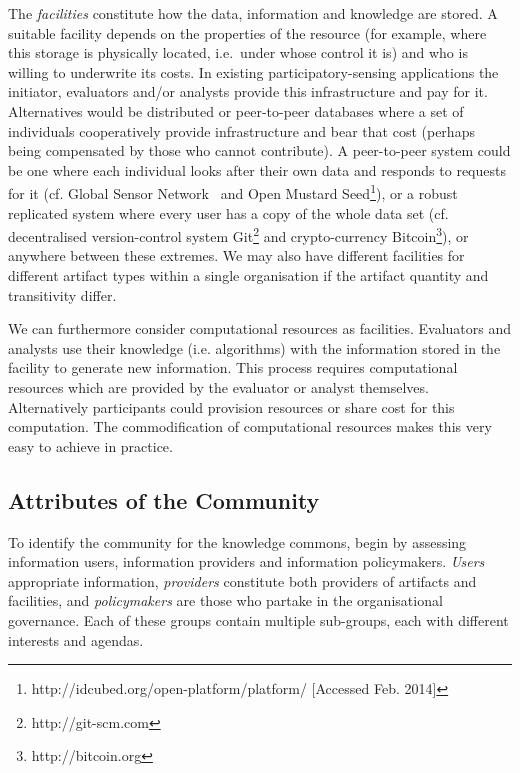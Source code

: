 The \emph{facilities} constitute how the data, information and knowledge are stored. A suitable facility depends on the properties of the resource (for example, where this storage is physically located, i.e.\ under whose control it is) and who is willing to underwrite its costs.  In existing participatory-sensing applications the initiator, evaluators and/or analysts provide this infrastructure and pay for it. Alternatives would be distributed or peer-to-peer databases where a set of individuals cooperatively provide infrastructure and bear that cost (perhaps being compensated by those who cannot contribute). 
A peer-to-peer system could be one where each individual looks after their own data and responds to requests for it (cf. Global Sensor Network~\citep{Aberer2006} and Open Mustard Seed\footnote{http://idcubed.org/open-platform/platform/ [Accessed Feb. 2014]}), or a robust replicated system where every user has a copy of the whole data set (cf. decentralised version-control system Git\footnote{http://git-scm.com} and crypto-currency Bitcoin\footnote{http://bitcoin.org}), or anywhere between these extremes. 
We may also have different facilities for different artifact types within a single organisation if the artifact quantity and transitivity differ.

We can furthermore consider computational resources as facilities.
Evaluators and analysts use their knowledge (i.e. algorithms) with the information stored in the facility to generate new information. This process requires computational resources which are provided by the evaluator or analyst themselves. Alternatively participants could provision resources or share cost for this computation. The commodification of computational resources makes this very easy to achieve in practice.

\subsection{Attributes of the Community}

To identify the community for the knowledge commons,  begin by assessing information users, information providers and information policymakers. 
\emph{Users} appropriate information, \emph{providers} constitute both providers of artifacts and facilities, and \emph{policymakers} are those who partake in the organisational governance. 
Each of these groups contain multiple sub-groups, each with different interests and agendas.

